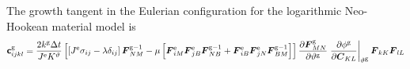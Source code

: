 \documentclass[10pt,letterpaper,oneside]{report}
\newcommand{\ten}[1]{\mbox{\boldmath $#1$}{}}
\newcommand{\tenf}[1]{\mbox{{\sffamily{\bfseries {#1}}}}}
\newcommand{\scas}[1]{\mbox{{\scriptsize{${\rm{#1}}$}}}{}}
\begin{document}
\begin{itemize}
The growth tangent in the Eulerian configuration for the logarithmic Neo-Hookean material model is
\begin{align}
\tenf{c}^{\scas{g}}_{ijkl} 
={}& \frac{2 k^{\scas{g}} \Delta t}{J^{\scas{e}} K^\vartheta} \left[ \left[ J^{\scas{e}} \sigma_{ij} - \lambda \delta_{ij} \right] \ten{F}^{\scas{g}-1}_{NM} 
- \mu \left[ \ten{F}^{\scas{e}}_{iM} \ten{F}^{\scas{e}}_{jB} \ten{F}^{\scas{g}-1}_{NB} + \ten{F}^{\scas{e}}_{iB} \ten{F}^{\scas{e}}_{jN} \ten{F}^{\scas{g}-1}_{BM} \right] \right] 
\frac{\partial \ten{F}^{\scas{g}}_{MN}}{\partial \vartheta^{\scas{g}}} \left. \frac{\partial \phi^{\scas{g}} }{\partial \ten{C}_{KL}} \right|_{\vartheta^{\scas{g}}} \ten{F}_{kK} \ten{F}_{lL} 
\\

\end{align}
\end{itemize}
\end{document}
